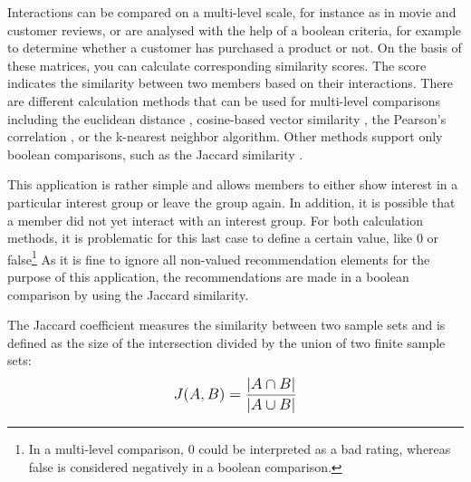 \documentclass[12pt,numbers=noenddot,parskip,bibliography=totocnumbered,listof=totocnumbered,draft]{scrreprt}
\begin{document}
Interactions can be compared on a multi-level scale, for instance as in movie and customer reviews, or are analysed with the help of a boolean criteria, for example to determine whether a customer has purchased a product or not. On the basis of these matrices, you can calculate corresponding similarity scores. The score indicates the similarity between two members based on their interactions. There are different calculation methods that can be used for multi-level comparisons including the euclidean distance \citep[p.75]{klahold2009}, cosine-based vector similarity \citep[p.71]{klahold2009}, the Pearson's correlation \citep[p.72]{klahold2009}, or the k-nearest neighbor \citep[p.76]{klahold2009} algorithm. Other methods support only boolean comparisons, such as the Jaccard similarity \citep[p.74]{klahold2009}. 

This application is rather simple and allows members to either show interest in a particular interest group or leave the group again. In addition, it is possible that a member did not yet interact with an interest group. For both calculation methods, it is problematic for this last case to define a certain value, like 0 or false\footnote{In a multi-level comparison, 0 could be interpreted as a bad rating, whereas false is considered negatively in a boolean comparison.} As it is fine to ignore all non-valued recommendation elements for the purpose of this application, the recommendations are made in a boolean comparison by using the Jaccard similarity. 

The Jaccard coefficient measures the similarity between two sample sets and is defined as the size of the intersection divided by the union of two finite sample sets:
\[
\mathlarger{J(A, B) = \frac{|A \cap B|}{|A \cup B|}}
\] 
\end{document}
